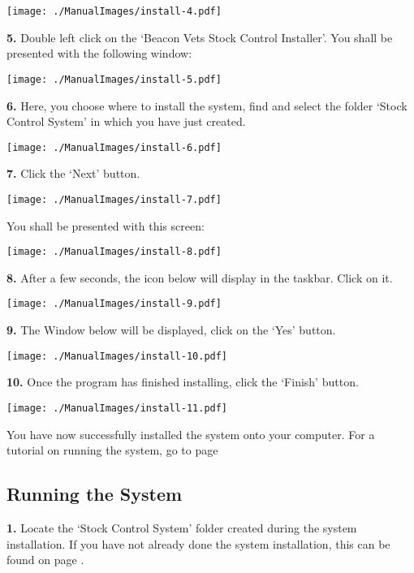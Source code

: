 \texttt{[image: ./ManualImages/install-4.pdf]}

\pagebreak

\textbf{5.} Double left click on the `Beacon Vets Stock Control Installer'. You shall be presented with the following window:

\texttt{[image: ./ManualImages/install-5.pdf]}

\pagebreak

\textbf{6.} Here, you choose where to install the system, find and select the folder `Stock Control System' in which you have just created.

\texttt{[image: ./ManualImages/install-6.pdf]}

\pagebreak

\textbf{7.} Click the `Next' button.

\texttt{[image: ./ManualImages/install-7.pdf]}

\pagebreak

You shall be presented with this screen:

\texttt{[image: ./ManualImages/install-8.pdf]}

\pagebreak

\textbf{8.} After a few seconds, the icon below will display in the taskbar. Click on it.

\texttt{[image: ./ManualImages/install-9.pdf]}

\pagebreak

\textbf{9.} The Window below will be displayed, click on the `Yes' button.

\texttt{[image: ./ManualImages/install-10.pdf]}

\pagebreak

\textbf{10.} Once the program has finished installing, click the `Finish' button.

\texttt{[image: ./ManualImages/install-11.pdf]}

You have now successfully installed the system onto your computer. For a tutorial on running the system, go to page \pageref{fig:Running the System}

\pagebreak

\subsection{Running the System}
\label{fig:Running the System}

\textbf{1.} Locate the `Stock Control System' folder created during the system installation. If you have not already done the system installation, this can be found on page \pageref{fig:System Installation}.

